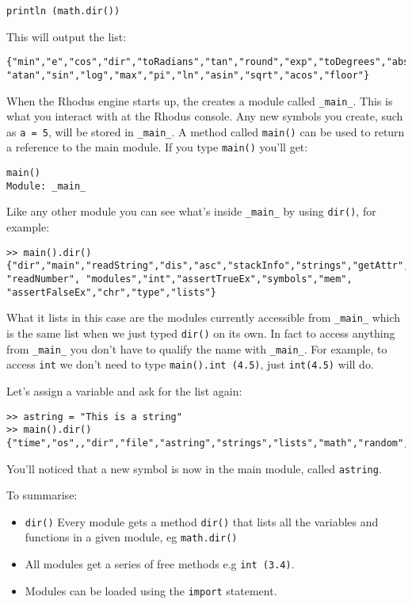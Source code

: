 \begin{lstlisting}
println (math.dir())
\end{lstlisting}

This will output the list:

\begin{lstlisting}
{"min","e","cos","dir","toRadians","tan","round","exp","toDegrees","abs","ceil",
"atan","sin","log","max","pi","ln","asin","sqrt","acos","floor"}
\end{lstlisting}

When the Rhodus engine starts up, the creates a module called {\tt _main_}. This is what you interact with at the Rhodus console. Any new symbols you create, such as {\tt a = 5}, will be stored in {\tt _main_}.  A method called {\tt main()} can be used to return a reference to the main module. If you type {\tt main()} you'll get:

\begin{lstlisting}
main()
Module: _main_
\end{lstlisting}

Like any other module you can see what's inside {\tt _main_} by using {\tt dir()}, for example:

\begin{lstlisting}
>> main().dir()
{"dir","main","readString","dis","asc","stackInfo","strings","getAttr","os",
"readNumber", "modules","int","assertTrueEx","symbols","mem",
"assertFalseEx","chr","type","lists"}
\end{lstlisting}

What it lists in this case are the modules currently accessible from {\tt _main_} which is the same list when we just typed {\tt dir()} on its own. In fact to access anything from {\tt _main_} you don't have to qualify the name with {\tt _main_}. For example, to access {\tt int} we don't need to type {\tt main().int (4.5)}, just {\tt int(4.5)} will do.

Let's assign a variable and ask for the list again:

\begin{lstlisting}
>> astring = "This is a string"
>> main().dir()
{"time","os",,"dir","file","astring","strings","lists","math","random","sys"}
\end{lstlisting}

You'll noticed that a new symbol is now in the main module, called {\tt astring}.

To summarise:

\begin{itemize}
\item {\tt dir()} Every module gets a method {\tt dir()} that lists all the variables and functions in a given module, eg {\tt math.dir()}
\item All modules get a series of free methods e.g {\tt int (3.4)}.
\item Modules can be loaded using the {\tt import} statement.
\end{itemize}

